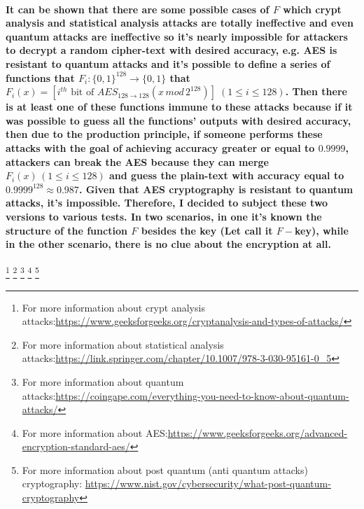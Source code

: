 \documentclass[oneside]{book}
\newcommand{\myparagraph}[1]{\paragraph{\textnormal{#1}}}
\begin{document}
\myparagraph{
It can be shown that there are some possible cases of $F$ which crypt analysis and statistical analysis attacks are totally ineffective and even quantum attacks are ineffective so it's nearly impossible for attackers to decrypt a random cipher-text with desired accuracy, e.g. AES is resistant to quantum attacks and it's possible to define a series of functions that $F_i : \{0, 1\}^{128} \rightarrow \{0, 1\} $ that $F_i(x) = [i^{th} \text{ bit of } AES_{128 \rightarrow 128}(x \, mod \, 2^{128})] \; (1 \le i \le 128)$. Then there is at least one of these functions immune to these attacks because if it was possible to guess all the functions' outputs with desired accuracy, then due to the production principle, if someone performs these attacks with the goal of achieving accuracy greater or equal to $0.9999$, attackers can break the AES because they can merge $F_i(x) \, (1 \le i \le 128)$ and guess the plain-text with accuracy equal to $0.9999^{128} \approx 0.987$. Given that AES cryptography is resistant to quantum attacks, it's impossible. Therefore, I decided to subject these two versions to various tests. In two scenarios, in one it's known the structure of the function $F$ besides the key (Let call it $F-$key), while in the other scenario, there is no clue about the encryption at all.
}
\footnote{For more information about crypt analysis attacks:\newline \href{https://www.geeksforgeeks.org/cryptanalysis-and-types-of-attacks/}{https://www.geeksforgeeks.org/cryptanalysis-and-types-of-attacks/}}
\footnote{For more information about statistical analysis attacks:\newline \href{https://link.springer.com/chapter/10.1007/978-3-030-95161-0_5}{https://link.springer.com/chapter/10.1007/978-3-030-95161-0\_5}}
\footnote{For more information about quantum attacks:\newline \href{https://coingape.com/everything-you-need-to-know-about-quantum-attacks/}{https://coingape.com/everything-you-need-to-know-about-quantum-attacks/}}
\footnote{For more information about AES:\newline \href{https://www.geeksforgeeks.org/advanced-encryption-standard-aes/}{https://www.geeksforgeeks.org/advanced-encryption-standard-aes/}}
\footnote{For more information about post quantum (anti quantum attacks) cryptography: \newline \href{https://www.nist.gov/cybersecurity/what-post-quantum-cryptography}{https://www.nist.gov/cybersecurity/what-post-quantum-cryptography}}
\end{document}
